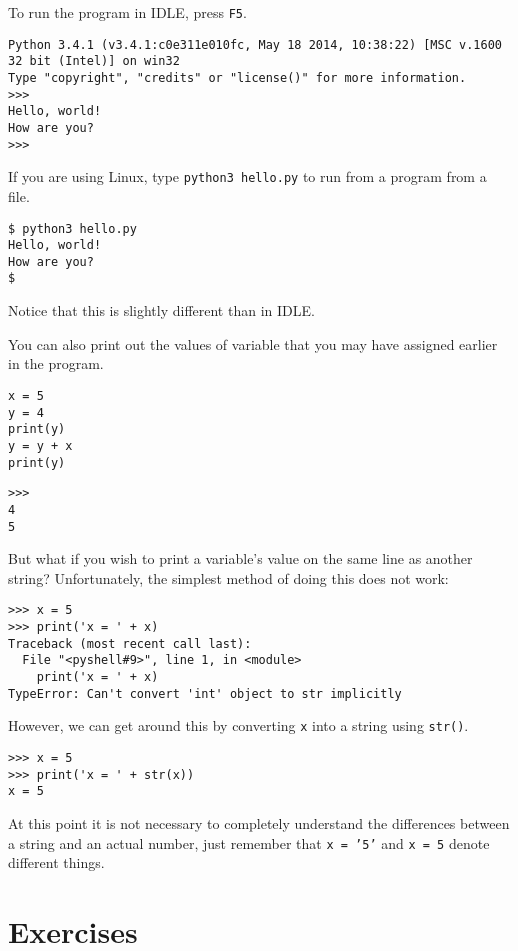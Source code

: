 \documentclass[12pt,hidelinks]{article}
\begin{document}
To run the program in IDLE, press \texttt{F5}. 
\begin{lstlisting}[style=bash]
Python 3.4.1 (v3.4.1:c0e311e010fc, May 18 2014, 10:38:22) [MSC v.1600 32 bit (Intel)] on win32
Type "copyright", "credits" or "license()" for more information.
>>> 
Hello, world!
How are you?
>>> 
\end{lstlisting}

If you are using Linux, type \texttt{python3 hello.py} to run from a program
from a file.
\begin{lstlisting}[style=bash]
$ python3 hello.py
Hello, world!
How are you?
$
\end{lstlisting}
Notice that this is slightly different than in IDLE.

You can also print out the values of variable that you may have assigned earlier
in the program.
\begin{lstlisting}[style=python]
x = 5
y = 4
print(y)
y = y + x
print(y)
\end{lstlisting}

\begin{lstlisting}[style=bash]
>>> 
4
5
\end{lstlisting}

But what if you wish to print a variable's value on the same line as another string? Unfortunately, the simplest method of doing this does not work:

\begin{lstlisting}[style=bash]
>>> x = 5
>>> print('x = ' + x)
Traceback (most recent call last):
  File "<pyshell#9>", line 1, in <module>
    print('x = ' + x)
TypeError: Can't convert 'int' object to str implicitly
\end{lstlisting}

However, we can get around this by converting \texttt{x} into a string using \texttt{str()}.

\begin{lstlisting}[style=bash]
>>> x = 5
>>> print('x = ' + str(x))
x = 5
\end{lstlisting}

At this point it is not necessary to completely understand the differences between a string and an actual number, just remember that \texttt{x = '5'} and \texttt{x = 5} denote different things.

\pagebreak

\section{Exercises}
\end{document}
